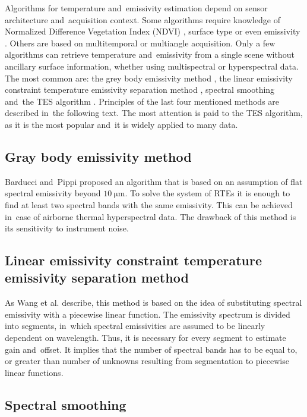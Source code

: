 Algorithms for temperature and~emissivity estimation depend on sensor architecture and~acquisition context. Some algorithms require knowledge of Normalized Difference Vegetation Index (NDVI) \cite{SR00}, surface type \cite{SW98} or even emissivity \cite{JC09}. Others are based on multitemporal \cite{W08} or multiangle \cite{SS07} acquisition. Only a few algorithms can retrieve temperature and~emissivity from a single scene without ancillary surface information, whether using multispectral or hyperspectral data. The most common are: the grey body emissivity method \cite{BP96}, the linear emissivity constraint temperature emissivity separation method \cite{WW11}, spectral smoothing \cite{B08} and~the TES algorithm \cite{GR98}. Principles of the last four mentioned methods are described in~the following text. The most attention is paid to the TES algorithm, as it is the most popular and~it is widely applied to many data.

\subsection*{Gray body emissivity method}

Barducci and~Pippi \cite{BP96} proposed an algorithm that is based on an assumption of flat spectral emissivity beyond $\SI{10}{\micro\meter}$. To solve the system of RTEs it is enough to find at least two spectral bands with the same emissivity. This can be achieved in~case of airborne thermal hyperspectral data. The drawback of this method is its sensitivity to instrument noise.

\subsection*{Linear emissivity constraint temperature emissivity separation method}

As Wang et al. \cite{WW11} describe, this method is based on the idea of substituting spectral emissivity with a piecewise linear function. The emissivity spectrum is divided into segments, in~which spectral emissivities are assumed to be linearly dependent on wavelength. Thus, it is necessary for every segment to estimate gain and~offset. It implies that the number of spectral bands has to be equal to, or greater than number of unknowns resulting from segmentation to piecewise linear functions.

\subsection*{Spectral smoothing}

